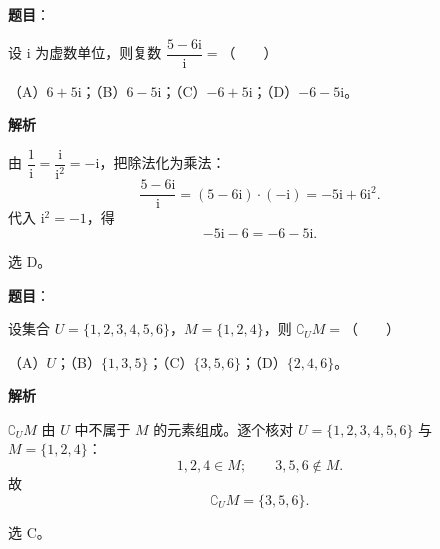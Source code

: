 

\begin{answer}

\textbf{题目}：

设 $\mathrm i$ 为虚数单位，则复数 $\dfrac{5-6\mathrm i}{\mathrm i}=$\mbox{（　　）}

（A）$6+5\mathrm i$；（B）$6-5\mathrm i$；（C）$-6+5\mathrm i$；（D）$-6-5\mathrm i$。

\textbf{解析}

由 $\dfrac1{\mathrm i}=\dfrac{\mathrm i}{\mathrm i^2}=-\mathrm i$，把除法化为乘法：
\nopagebreak[4]
\[\frac{5-6\mathrm i}{\mathrm i}=(5-6\mathrm i)\cdot(-\mathrm i)=-5\mathrm i+6\mathrm i^2.\]
代入 $\mathrm i^2=-1$，得
\nopagebreak[4]
\[-5\mathrm i-6=-6-5\mathrm i.\]

选 D。


\end{answer}
\begin{answer}

\textbf{题目}：

设集合 $U=\{1,2,3,4,5,6\}$，$M=\{1,2,4\}$，则 $\complement_U M=$\mbox{（　　）}

（A）$U$；（B）$\{1,3,5\}$；（C）$\{3,5,6\}$；（D）$\{2,4,6\}$。

\textbf{解析}

$\complement_U M$ 由 $U$ 中不属于 $M$ 的元素组成。逐个核对 $U=\{1,2,3,4,5,6\}$ 与 $M=\{1,2,4\}$：
\nopagebreak[4]
\[1,2,4\in M;\qquad 3,5,6\notin M.\]
故
\nopagebreak[4]
\[\complement_U M=\{3,5,6\}.\]

选 C。


\end{answer}
